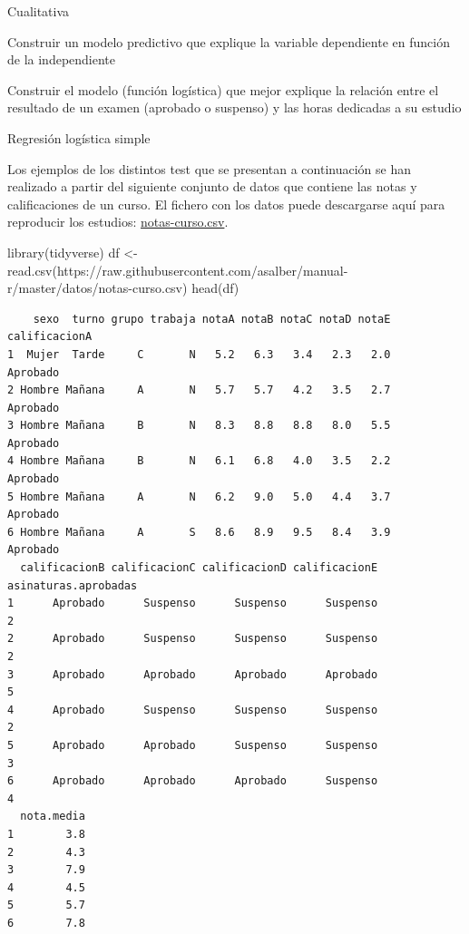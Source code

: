 \documentclass[
  a4paper,
]{scrreport}
\newenvironment{Shaded}{\begin{snugshade}}{\end{snugshade}}
\newcommand{\FunctionTok}[1]{\textcolor[rgb]{0.28,0.35,0.67}{#1}}
\newcommand{\NormalTok}[1]{\textcolor[rgb]{0.00,0.23,0.31}{#1}}
\newcommand{\OtherTok}[1]{\textcolor[rgb]{0.00,0.23,0.31}{#1}}
\newcommand{\StringTok}[1]{\textcolor[rgb]{0.13,0.47,0.30}{#1}}
\theoremstyle{definition}
\theoremstyle{definition}
\theoremstyle{remark}
\begin{document}
Cualitativa

Construir un modelo predictivo que explique la variable dependiente en
función de la independiente

Construir el modelo (función logística) que mejor explique la relación
entre el resultado de un examen (aprobado o suspenso) y las horas
dedicadas a su estudio

Regresión logística simple

Los ejemplos de los distintos test que se presentan a continuación se
han realizado a partir del siguiente conjunto de datos que contiene las
notas y calificaciones de un curso. El fichero con los datos puede
descargarse aquí para reproducir los estudios:
\href{https://raw.githubusercontent.com/asalber/manual-r/master/datos/notas-curso.csv}{notas-curso.csv}.

\begin{Shaded}
\begin{Highlighting}[]
\FunctionTok{library}\NormalTok{(tidyverse)}
\NormalTok{df }\OtherTok{\textless{}{-}} \FunctionTok{read.csv}\NormalTok{(}\StringTok{\textquotesingle{}https://raw.githubusercontent.com/asalber/manual{-}r/master/datos/notas{-}curso.csv\textquotesingle{}}\NormalTok{)}
\FunctionTok{head}\NormalTok{(df)}
\end{Highlighting}
\end{Shaded}

\begin{verbatim}
    sexo  turno grupo trabaja notaA notaB notaC notaD notaE calificacionA
1  Mujer  Tarde     C       N   5.2   6.3   3.4   2.3   2.0      Aprobado
2 Hombre Mañana     A       N   5.7   5.7   4.2   3.5   2.7      Aprobado
3 Hombre Mañana     B       N   8.3   8.8   8.8   8.0   5.5      Aprobado
4 Hombre Mañana     B       N   6.1   6.8   4.0   3.5   2.2      Aprobado
5 Hombre Mañana     A       N   6.2   9.0   5.0   4.4   3.7      Aprobado
6 Hombre Mañana     A       S   8.6   8.9   9.5   8.4   3.9      Aprobado
  calificacionB calificacionC calificacionD calificacionE asinaturas.aprobadas
1      Aprobado      Suspenso      Suspenso      Suspenso                    2
2      Aprobado      Suspenso      Suspenso      Suspenso                    2
3      Aprobado      Aprobado      Aprobado      Aprobado                    5
4      Aprobado      Suspenso      Suspenso      Suspenso                    2
5      Aprobado      Aprobado      Suspenso      Suspenso                    3
6      Aprobado      Aprobado      Aprobado      Suspenso                    4
  nota.media
1        3.8
2        4.3
3        7.9
4        4.5
5        5.7
6        7.8
\end{verbatim}
\end{document}
